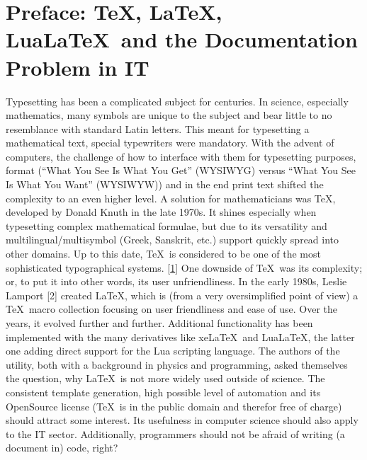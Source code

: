 \chapter{Preface: \TeX, \LaTeX, Lua\LaTeX~and the Documentation Problem in IT}
	\label{chapter:preface}
	Typesetting has been a complicated subject for centuries. In science, especially mathematics, many symbols are unique to the subject and bear little to no resemblance with standard Latin letters. This meant for typesetting a mathematical text, special typewriters were mandatory. With the advent of computers, the challenge of how to interface with them for typesetting purposes, format (\enquote{What You See Is What You Get} (WYSIWYG) versus \enquote{What You See Is What You Want} (WYSIWYW)) and in the end print text shifted the complexity to an even higher level. 
	\newline A solution for mathematicians was \TeX, developed by Donald Knuth in the late 1970s. It shines especially when typesetting complex mathematical formulae, but due to its versatility and multilingual/multisymbol (Greek, Sanskrit, etc.) support quickly spread into other domains. Up to this date, \TeX~is considered to be one of the most sophisticated typographical systems. [\hyperref[preface:references]{1}]
	\newline One downside of \TeX~was its complexity; or, to put it into other words, its user unfriendliness. In the early 1980s, Leslie Lamport [2] created \LaTeX, which is (from a very oversimplified point of view) a \TeX~macro collection focusing on user friendliness and ease of use. Over the years, it evolved further and further. 
	Additional functionality has been implemented with the many derivatives like xe\LaTeX~and Lua\LaTeX, the latter one adding direct support for the Lua scripting language.
	\newline The authors of the utility, both with a background in physics and programming, asked themselves the question, why \LaTeX~is not more widely used outside of science. The consistent template generation, high possible level of automation and its OpenSource license (\TeX~is in the public domain and therefor free of charge) should attract some interest. Its usefulness in computer science should also apply to the IT sector. Additionally, programmers should not be afraid of writing (a document in) code, right? 
